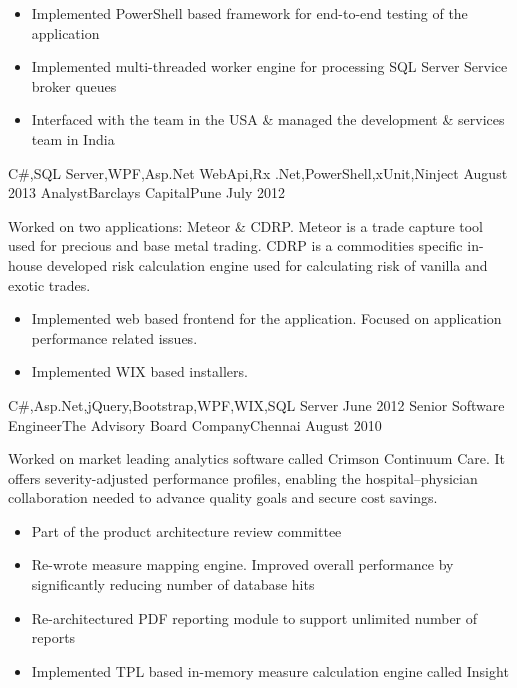\begin{experiences}
{\begin{itemize}
                        \item Implemented PowerShell based framework for end-to-end testing of the application
                        \item Implemented multi-threaded worker engine for processing SQL Server Service broker queues
                        \item Interfaced with the team in the USA \& managed the development \& services team in India\\
                      \end{itemize}
                    }
                    {C\#,SQL Server,WPF,Asp.Net WebApi,Rx .Net,PowerShell,xUnit,Ninject}
  \emptySeparator
  \experience
  {August 2013}     {Analyst}{Barclays Capital}{Pune}
  {July 2012}   	{
  					  Worked on two applications: Meteor \& CDRP. Meteor is a trade capture tool used for precious and base metal trading. CDRP is a commodities specific in-house
  					  developed risk calculation engine used for calculating risk of vanilla and exotic trades.
                      \begin{itemize}
                        \item Implemented web based frontend for the application. Focused on application performance related issues.
                        \item Implemented WIX based installers.\\
                      \end{itemize}
                    }
                    {C\#,Asp.Net,jQuery,Bootstrap,WPF,WIX,SQL Server}
  \emptySeparator         
  \experience
  {June 2012}  {Senior Software Engineer}{The Advisory Board Company}{Chennai}
  {August 2010}   {
                      Worked on market leading analytics software called Crimson Continuum Care. It offers severity-adjusted performance profiles, enabling the hospital–physician collaboration needed to advance quality goals and secure cost savings.  
                      \begin{itemize}
                        \item Part of the product architecture review committee
                        \item Re-wrote measure mapping engine. Improved overall performance by significantly reducing number of database hits
                        \item Re-architectured PDF reporting module to support unlimited number of reports
                        \item Implemented TPL based in-memory measure calculation engine called Insight\\  

\end{itemize}}
\end{experiences}
